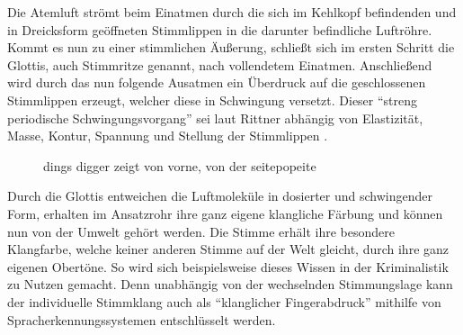 Die Atemluft strömt beim Einatmen durch die sich im Kehlkopf befindenden und in Dreicksform geöffneten Stimmlippen in die darunter befindliche Luftröhre. Kommt es nun zu einer stimmlichen Äußerung, schließt sich im ersten Schritt die Glottis, auch Stimmritze genannt, nach vollendetem Einatmen. Anschließend wird durch das nun folgende Ausatmen ein Überdruck auf die geschlossenen Stimmlippen erzeugt, welcher diese in Schwingung versetzt. Dieser "`streng periodische Schwingungsvorgang"' \autocite[481]{rittner2009a} sei laut Rittner abhängig von Elastizität, Masse, Kontur, Spannung und Stellung der Stimmlippen \autocite[vgl.][481]{rittner2009a}.

\begin{figure}
  \centering
  \hfill
  \caption[]{dings digger  zeigt von vorne,   von der seitepopeite}
  \label{fig:stimmlippen}
\end{figure}

Durch die Glottis entweichen die Luftmoleküle in dosierter und schwingender Form, erhalten im Ansatzrohr ihre ganz eigene klangliche Färbung und können nun von der Umwelt gehört werden. Die Stimme erhält ihre besondere Klangfarbe, welche keiner anderen Stimme auf der Welt gleicht, durch ihre ganz eigenen Obertöne. So wird sich beispielsweise dieses Wissen in der Kriminalistik zu Nutzen gemacht. Denn unabhängig von der wechselnden Stimmungslage kann der individuelle Stimmklang auch als "`klanglicher Fingerabdruck"' \autocite[482]{rittner2009a} mithilfe von Spracherkennungssystemen entschlüsselt werden. 

